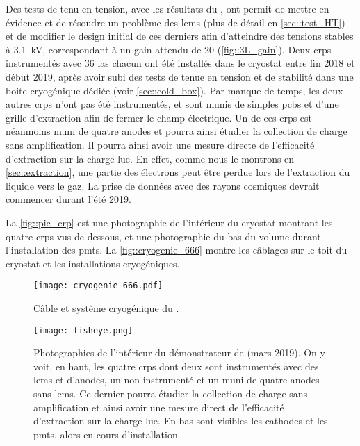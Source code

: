       Des tests de tenu en tension, avec les résultats du \TOO{}, ont permit de mettre en évidence et de résoudre un problème des \glspl{lem} (plus de détail en \autoref{sec::test_HT}) et de modifier le design initial de ces derniers afin d'atteindre des tensions stables à \SI{3.1}{\kilo\volt}, correspondant à un gain attendu de 20 (\autoref{fig::3L_gain}). Deux \glspl{crp} instrumentés avec 36 \gls{las} chacun ont été installés dans le cryostat entre fin 2018 et début 2019, après avoir subi des tests de tenue en tension et de stabilité dans une boite cryogénique dédiée (voir \autoref{sec::cold_box}). Par manque de temps, les deux autres \glspl{crp} n'ont pas été instrumentés, et sont munis de simples \glspl{pcb} et d'une grille d'extraction afin de fermer le champ électrique. Un de ces \glspl{crp} est néanmoins muni de quatre anodes et pourra ainsi étudier la collection de charge sans amplification. Il pourra ainsi avoir une mesure directe de l'efficacité d'extraction sur la charge lue. En effet, comme nous le montrons en \autoref{sec::extraction}, une partie des électrons peut être perdue lors de l'extraction du liquide vers le gaz. La prise de données avec des rayons cosmiques devrait commencer durant l'été 2019. 

      La \autoref{fig::pic_crp} est une photographie de l'intérieur du cryostat montrant les quatre \glspl{crp} vus de dessous, et une photographie du bas du volume durant l'installation des \glspl{pmt}. La \autoref{fig::cryogenie_666} montre les câblages sur le toit du cryostat et les installations cryogéniques.

      \begin{figure}[htbp]
        \centering
        \texttt{[image: cryogenie\_666.pdf]}
        \caption[Câble et système cryogénique du \SSS{}.]{\label{fig::cryogenie_666}Câble et système cryogénique du \SSS{}.}
      \end{figure}

      \begin{figure}[htbp]
        \centering
        \texttt{[image: fisheye.png]}        
        \caption[Photographie de l'intétrieur du démonstrateur de \SSS{}.]{\label{fig::pic_crp}Photographies de l'intérieur du démonstrateur de \SSS{} (mars 2019). On y voit, en haut, les quatre \glspl{crp} dont deux sont instrumentés avec des \glspl{lem} et d'anodes, un non instrumenté et un muni de quatre anodes sans \glspl{lem}. Ce dernier pourra étudier la collection de charge sans amplification et ainsi avoir une mesure direct de l'efficacité d'extraction sur la charge lue. En bas sont visibles les cathodes et les \glspl{pmt}, alors en cours d'installation.}
      \end{figure}

